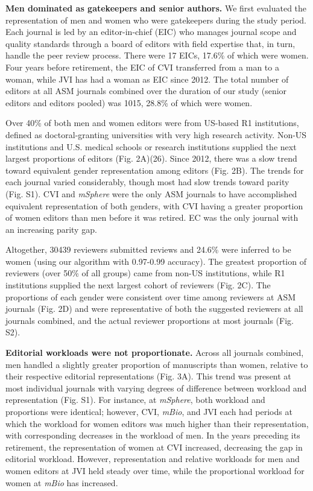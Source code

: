 \documentclass[11pt,]{article}
\begin{document}
\textbf{Men dominated as gatekeepers and senior authors.} We first
evaluated the representation of men and women who were gatekeepers
during the study period. Each journal is led by an editor-in-chief (EIC)
who manages journal scope and quality standards through a board of
editors with field expertise that, in turn, handle the peer review
process. There were 17 EICs, 17.6\% of which were women. Four years
before retirement, the EIC of CVI transferred from a man to a woman,
while JVI has had a woman as EIC since 2012. The total number of editors
at all ASM journals combined over the duration of our study (senior
editors and editors pooled) was 1015, 28.8\% of which were women.

Over 40\% of both men and women editors were from US-based R1
institutions, defined as doctoral-granting universities with very high
research activity. Non-US institutions and U.S. medical schools or
research institutions supplied the next largest proportions of editors
(Fig. 2A)(26). Since 2012, there was a slow trend toward equivalent
gender representation among editors (Fig. 2B). The trends for each
journal varied considerably, though most had slow trends toward parity
(Fig. S1). CVI and \emph{mSphere} were the only ASM journals to have
accomplished equivalent representation of both genders, with CVI having
a greater proportion of women editors than men before it was retired. EC
was the only journal with an increasing parity gap.

Altogether, 30439 reviewers submitted reviews and 24.6\% were inferred
to be women (using our algorithm with 0.97-0.99 accuracy). The greatest
proportion of reviewers (over 50\% of all groups) came from non-US
institutions, while R1 institutions supplied the next largest cohort of
reviewers (Fig. 2C). The proportions of each gender were consistent over
time among reviewers at ASM journals (Fig. 2D) and were representative
of both the suggested reviewers at all journals combined, and the actual
reviewer proportions at most journals (Fig. S2).

\textbf{Editorial workloads were not proportionate.} Across all journals
combined, men handled a slightly greater proportion of manuscripts than
women, relative to their respective editorial representations (Fig. 3A).
This trend was present at most individual journals with varying degrees
of difference between workload and representation (Fig. S1). For
instance, at \emph{mSphere}, both workload and proportions were
identical; however, CVI, \emph{mBio}, and JVI each had periods at which
the workload for women editors was much higher than their
representation, with corresponding decreases in the workload of men. In
the years preceding its retirement, the representation of women at CVI
increased, decreasing the gap in editorial workload. However,
representation and relative workloads for men and women editors at JVI
held steady over time, while the proportional workload for women at
\emph{mBio} has increased.
\end{document}
